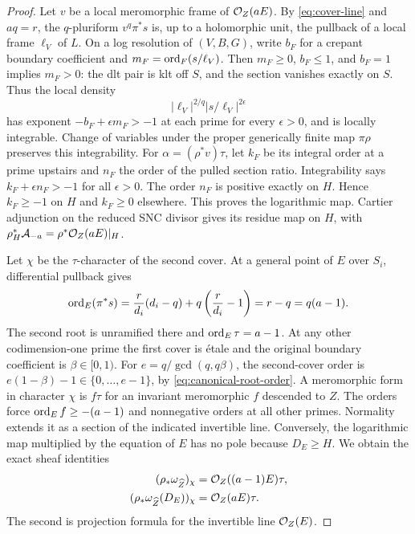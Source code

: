 \begin{proof}
Let \(v\) be a local meromorphic frame of \(\mathcal O_Z(aE)\).  By
\eqref{eq:cover-line} and \(aq=r\), the \(q\)-pluriform
\(v^q\pi^*s\) is, up to a holomorphic unit, the pullback of a local frame
\(\ell_V\) of \(L\).  On a log resolution of \((V,B,G)\), write \(b_F\)
for a crepant boundary coefficient and
\(m_F=\operatorname{ord}_F(s/\ell_V)\).  Then \(m_F\geq0\), \(b_F\leq1\), and
\(b_F=1\) implies \(m_F>0\): the dlt pair is klt off \(S\), and the
section vanishes exactly on \(S\).  Thus the local density
\[
 |\ell_V|^{2/q}|s/\ell_V|^{2\epsilon}
\]
has exponent \(-b_F+\epsilon m_F>-1\) at each prime for every
\(\epsilon>0\), and is locally integrable.  Change of variables under
the proper generically finite map \(\pi\rho\) preserves this integrability.
For \(\alpha=(\rho^*v)\tau\), let \(k_F\) be its integral order at a
prime upstairs and \(n_F\) the order of the pulled section ratio.
Integrability says \(k_F+\epsilon n_F>-1\) for all \(\epsilon>0\).
The order \(n_F\) is positive exactly on \(H\).  Hence \(k_F\geq-1\)
on \(H\) and \(k_F\geq0\) elsewhere.  This proves the logarithmic map.
Cartier adjunction on the reduced SNC divisor gives its residue map on
\(H\), with \(\rho_H^*\mathcal A_{-a}=\rho^*\mathcal O_Z(aE)|_H\).

Let \(\chi\) be the \(\tau\)-character of the second cover.  At a general
point of \(E\) over \(S_i\), differential pullback gives
\[
 \operatorname{ord}_E(\pi^*s)
 =\frac r{d_i}(d_i-q)+q\left(\frac r{d_i}-1\right)
 =r-q=q(a-1).
\]
The second root is unramified there and \(\operatorname{ord}_E\tau=a-1\).  At any
other codimension-one prime the first cover is \'etale and the original
boundary coefficient is \(\beta\in[0,1)\).  For
\(e=q/\gcd(q,q\beta)\), the second-cover order is
\(e(1-\beta)-1\in\{0,\ldots,e-1\}\), by
\eqref{eq:canonical-root-order}.  A meromorphic form in character
\(\chi\) is \(f\tau\) for an invariant meromorphic \(f\) descended
to \(Z\).  The orders force \(\operatorname{ord}_E f\geq-(a-1)\) and nonnegative
orders at all other primes.  Normality extends it as a section of the
indicated invertible line.  Conversely, the logarithmic map multiplied
by the equation of \(E\) has no pole because \(D_E\geq H\).  We obtain
the exact sheaf identities
\begin{align}
 (\rho_*\omega_{\widehat Z})_\chi
   &=\mathcal O_Z((a-1)E)\tau,\label{eq:residue-character-one}\\
 (\rho_*\omega_{\widehat Z}(D_E))_\chi
   &=\mathcal O_Z(aE)\tau.\label{eq:residue-character-two}
\end{align}
The second is projection formula for the invertible line \(\mathcal O_Z(E)\).


\end{proof}
